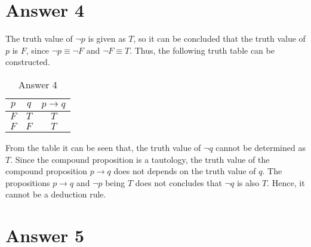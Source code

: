 \documentclass[12pt]{article}
\begin{document}
\section*{Answer 4}

\vspace{5px}

\quad The truth value of $\neg p$ is given as $T$, so it can be concluded that the truth value of $p$ is $F$, since $\neg p \equiv \neg F$ and $\neg F \equiv T$. Thus, the following truth table can be constructed.

\vspace{5px}
\begin{table}[H]
\centering
\caption{Answer 4}
\label{my-label3}
\begin{tabular}{|c|c|c|}
\hline
$p$&$q$&$ p \rightarrow q$\\ \hline
$F$&$T$&$T$\\ \hline
$F$&$F$&$T$\\ \hline
\end{tabular}
\end{table}

From the table it can be seen that, the truth value of $\neg q$ cannot be determined as $T$. Since the compound proposition is a tautology, the truth value of the compound proposition $p \rightarrow q$ does not depends on the truth value of $q$. The propositions $p \rightarrow q$ and $\neg p$ being $T$ does not concludes that $\neg q$ is also $T$. Hence, it cannot be a deduction rule.


\section*{Answer 5}

\vspace{10px}
\end{document}
